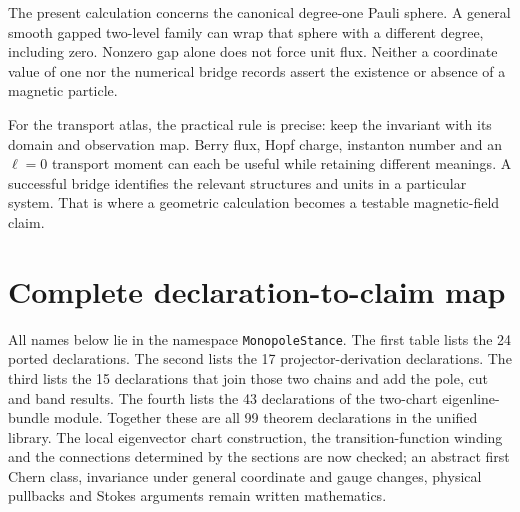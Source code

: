 \documentclass[11pt]{article}
\theoremstyle{definition}\newtheorem{definition}[theorem]{Definition}
\theoremstyle{remark}\newtheorem{remark}[theorem]{Remark}
\begin{document}
The present calculation concerns the canonical degree-one Pauli sphere. A general smooth gapped two-level family can wrap that sphere with a different degree, including zero. Nonzero gap alone does not force unit flux. Neither a coordinate value of one nor the numerical bridge records assert the existence or absence of a magnetic particle.

For the transport atlas, the practical rule is precise: keep the invariant with its domain and observation map. Berry flux, Hopf charge, instanton number and an $\ell=0$ transport moment can each be useful while retaining different meanings. A successful bridge identifies the relevant structures and units in a particular system. That is where a geometric calculation becomes a testable magnetic-field claim.

\clearpage
\appendix
\section{Complete declaration-to-claim map}\label{sec:map}
All names below lie in the namespace \texttt{MonopoleStance}. The first table lists the 24 ported declarations. The second lists the 17 projector-derivation declarations. The third lists the 15 declarations that join those two chains and add the pole, cut and band results. The fourth lists the 43 declarations of the two-chart eigenline-bundle module. Together these are all 99 theorem declarations in the unified library. The local eigenvector chart construction, the transition-function winding and the connections determined by the sections are now checked; an abstract first Chern class, invariance under general coordinate and gauge changes, physical pullbacks and Stokes arguments remain written mathematics.
\end{document}
